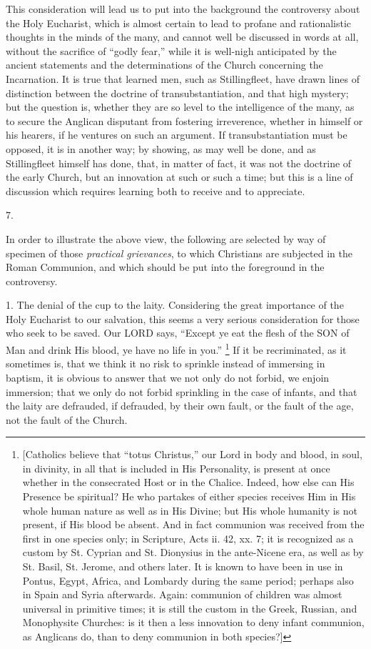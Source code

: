 This consideration will lead us to put into the
background the controversy about the Holy Eucharist, which is almost
certain to lead to profane and rationalistic thoughts in the minds of
the many, and cannot well be discussed in words at all, without the
sacrifice of ``godly fear,'' while it is well-nigh anticipated by the
ancient statements and the determinations of the Church concerning the
Incarnation. It is true that learned men, such as Stillingfleet, have
drawn lines of distinction between the doctrine of transubstantiation,
and that high mystery; but the question is, whether they are so level
to the intelligence of the many, as to secure the Anglican disputant
from fostering irreverence, whether in himself or his hearers, if he
ventures on such an argument. If transubstantiation must be opposed,
it is in another way; by showing, as may well be done, and as
Stillingfleet himself has done, that, in matter of fact, it was not
the doctrine of the early Church, but an innovation at such or such a
time; but this is a line of discussion which requires learning both to
receive and to appreciate.

7.

In order to illustrate the above view, the
following are selected by way of specimen of those \emph{practical
grievances}, to which Christians are subjected in the Roman
Communion, and which should be put into the foreground in the
controversy.

1. The denial of the cup to the laity.
Considering the great importance of the Holy Eucharist to our
salvation, this seems a very serious consideration for those who seek
to be saved. Our LORD
says, ``Except ye eat the flesh of the SON
of Man and drink His blood, ye have no life in you.'' \footnote{[Catholics believe that ``totus Christus,'' our
Lord in body and blood, in soul, in divinity, in all that is included
in His Personality, is present at once whether in the consecrated Host
or in the Chalice. Indeed, how else can His Presence be spiritual? He
who partakes of either species receives Him in His whole human nature
as well as in His Divine; but His whole humanity is not present, if
His blood be absent. And in fact communion was received from the first
in one species only; in Scripture, Acts ii. 42, xx. 7; it is
recognized as a custom by St. Cyprian and St. Dionysius in the
ante-Nicene era, as well as by St. Basil, St. Jerome, and others
later. It is known to have been in use in Pontus, Egypt, Africa, and
Lombardy during the same period; perhaps also in Spain and Syria
afterwards. Again: communion of children was almost universal in
primitive times; it is still the custom in the Greek, Russian, and
Monophysite Churches: is it then a less innovation to deny infant
communion, as Anglicans do, than to deny communion in both species?]} If it be recriminated, as it sometimes is, that we think it no
risk to sprinkle instead of immersing in baptism, it is obvious to
answer that we not only do not forbid, we enjoin immersion; that we
only do not forbid sprinkling in the case of infants, and that the
laity are defrauded, if defrauded, by their own fault, or the fault of
the age, not the fault of the Church.


